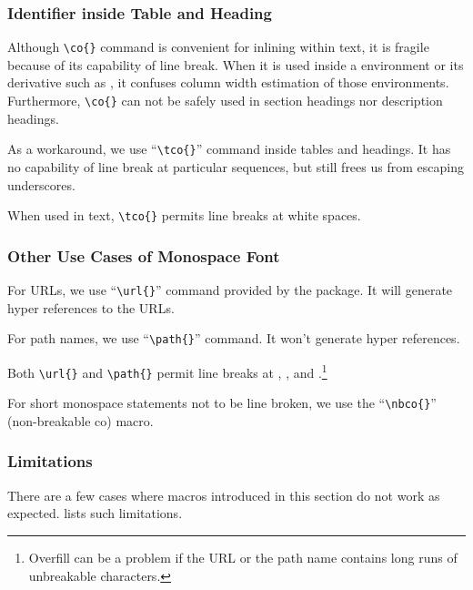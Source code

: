\subsubsection{Identifier inside Table and Heading}
\label{sec:app:styleguide:Identifier inside Table and Heading}

Although \verb|\co{}| command is convenient for inlining within text,
it is fragile because of its capability of line break.
When it is used inside a  environment or its derivative
such as , it confuses column width
estimation of those environments.
Furthermore, \verb|\co{}| can not be safely used in section headings nor
description headings.

As a workaround, we use ``\verb|\tco{}|'' command
inside tables and headings.
It has no capability of line break at particular sequences, but
still frees us from escaping underscores.

When used in text, \verb|\tco{}| permits line breaks at
white spaces.

\subsubsection{Other Use Cases of Monospace Font}
\label{sec:app:styleguide:Other Use Cases of Monospace Font}

For URLs, we use ``\verb|\url{}|'' command provided by the
 package.
It will generate hyper references to the URLs.

For path names, we use ``\verb|\path{}|'' command.
It won't generate hyper references.

Both \verb|\url{}| and \verb|\path{}| permit line breaks
at \qco{/}, \qco{-}, and .\footnote{
  Overfill can be a problem if the URL or the path name contains
  long runs of unbreakable characters.
}

For short monospace statements not to be line broken, we use
the ``\verb|\nbco{}|'' (non-breakable co) macro.

\subsubsection{Limitations}
\label{sec:app:styleguide:Limitations}

There are a few cases where macros introduced in this section
do not work as expected.
lists such limitations.

